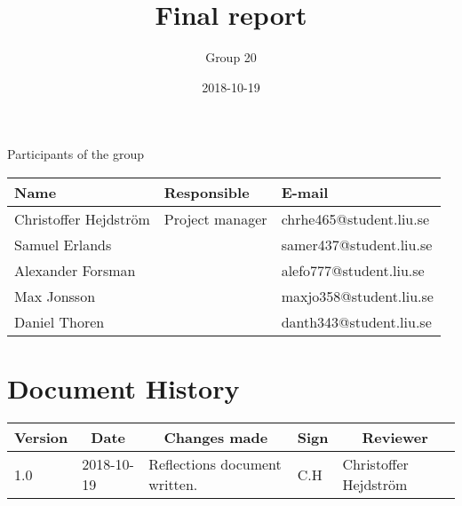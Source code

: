 \documentclass[10pt,oneside,english]{lips}
\title{Final report}
\author{Group 20}
\date{2018-10-19}
\begin{document}
  \setlength\parindent{0pt}
  \maketitle
  
  \cleardoublepage
  \makeprojectid
  
  \begin{center}
    \Large Participants of the group
  \end{center}
  \begin{center}
    \begin{tabular}{|l|l|l|}
      \hline
      \textbf{Name} & \textbf{Responsible} & \textbf{E-mail}\\ \hline
      Christoffer Hejdström & Project manager & chrhe465@student.liu.se \\ \hline
      Samuel Erlands & & samer437@student.liu.se \\ \hline
      Alexander Forsman & & alefo777@student.liu.se\\ \hline
      Max Jonsson & & maxjo358@student.liu.se\\ \hline
      Daniel Thoren & & danth343@student.liu.se\\
      \hline
    \end{tabular}
  \end{center}
  
  
  \cleardoublepage
  \tableofcontents
  
  \cleardoublepage
  \section*{Document History}
  \begin{tabular}{p{}|p{}|p{}|p{}|p{}} 
    \multicolumn{1}{c}{\bfseries Version} & 
    \multicolumn{1}{|c}{\bfseries Date} & 
    \multicolumn{1}{|c}{\bfseries Changes made} & 
    \multicolumn{1}{|c}{\bfseries Sign} & 
    \multicolumn{1}{|c}{\bfseries Reviewer}\\
    \hline
    \hline
    1.0 & 2018-10-19 & Reflections document written. & C.H & Christoffer Hejdström \\ \hline
  \end{tabular}
  
  \cleardoublepage
  \cfoot{\thepage}
  
    
  
  
  
  
  \clearpage
  \cleardoublepage
  \appendix
  
  
\end{document}
